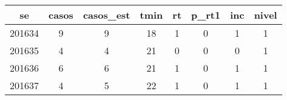 \begin{tabular}{c|ccccccc}
  \hline
se & casos & casos\_est & tmin & rt & p\_rt1 & inc & nivel \\ 
  \hline
201634 & 9 & 9 & 18 & 1 & 0 & 1 & 1 \\ 
  201635 & 4 & 4 & 21 & 0 & 0 & 0 & 1 \\ 
  201636 & 6 & 6 & 21 & 1 & 0 & 1 & 1 \\ 
  201637 & 4 & 5 & 22 & 1 & 0 & 1 & 1 \\ 
   \hline
\end{tabular}
